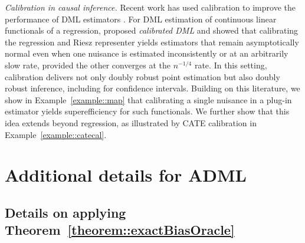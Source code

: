 \documentclass[11pt]{article}
\theoremstyle{definition}
\begin{document}
 
 \textit{Calibration in causal inference.} Recent work has used calibration to improve the performance of DML estimators \citep{gutman2022propensity, van2023causal, deshpande2023calibrated, ballinari2024improving, van2024automatic, van2024stabilized, rabenseifner2025calibration}. For DML estimation of continuous linear functionals of a regression, \citet{van2024automatic} proposed \textit{calibrated DML} and showed that calibrating the regression and Riesz representer yields estimators that remain asymptotically normal even when one nuisance is estimated inconsistently or at an arbitrarily slow rate, provided the other converges at the \(n^{-1/4}\) rate. In this setting, calibration delivers not only doubly robust point estimation but also doubly robust inference, including for confidence intervals. Building on this literature, we show in Example~\ref{example::map} that calibrating a single nuisance in a plug-in estimator yields superefficiency for such functionals. We further show that this idea extends beyond regression, as illustrated by CATE calibration in Example~\ref{example::catecal}.





 
\section{Additional details for ADML}
 


 \subsection{Details on applying  Theorem~\ref{theorem::exactBiasOracle}}
 \label{appendix::modelapproxproj}

 
 
\end{document}
